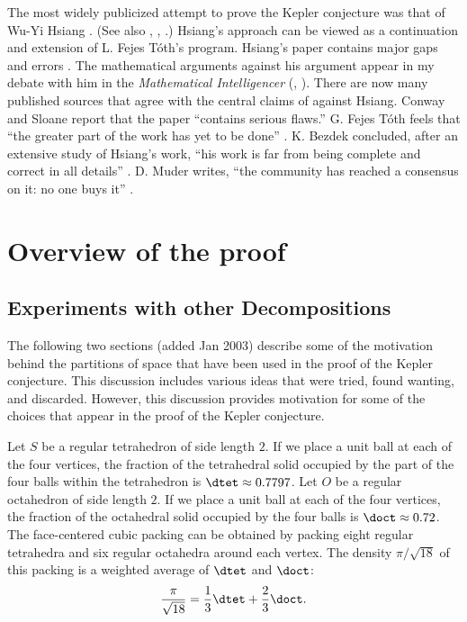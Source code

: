 \smallskip
The most widely publicized attempt to prove the Kepler conjecture
was that of Wu-Yi Hsiang \cite{Hsi93}.  (See also \cite{Hsi93a},
\cite{Hsi93b}, \cite{Hsi02}.)  Hsiang's approach can be viewed as
a continuation and extension of L. Fejes T\'oth's program.
Hsiang's paper contains major gaps and errors \cite{CoHMS94}.
  The mathematical arguments against his argument appear
in my
debate with him in the {\it Mathematical Intelligencer}
(\cite{Hal94}, \cite{Hsi95}).
There are now many published sources that agree with the central
claims of \cite{Hal94} against Hsiang.
Conway and Sloane report that the paper ``contains serious flaws.''
G. Fejes T\'oth feels that ``the greater part of the work has yet
to be done'' \cite{Fej95}.   K. Bezdek concluded,
after an extensive study of Hsiang's work, ``his work is far from being
complete and correct in all details'' \cite{Bez97}.
 D. Muder writes, ``the
community has reached a consensus on it: no one buys it'' \cite{Mud97}.


\chapter{Overview of the proof}

\section{Experiments with other Decompositions}
\label{sec:experiment}

The following two sections (added Jan 2003)  describe some of the
motivation behind the partitions of space that have been used in the
proof of the Kepler conjecture.  This discussion includes various
ideas that were tried, found wanting, and discarded. However, this
discussion provides motivation for some of the choices that appear
in the proof of the Kepler conjecture.

Let $S$ be a regular tetrahedron of side length $2$.  If we place a
unit ball at each of the four vertices, the fraction of the
tetrahedral solid occupied by the part of the four balls within the
tetrahedron is $\dtet\approx 0.7797$. Let $O$ be a regular
octahedron of side length $2$.  If we place a unit ball at each of
the four vertices, the fraction of the octahedral solid occupied by
the four balls is $\doct\approx 0.72$. The face-centered cubic
packing can be obtained by packing eight regular tetrahedra and six
regular octahedra around each vertex. The density $\pi/\sqrt{18}$ of
this packing is a weighted average of $\dtet$ and $\doct$:
    $$\frac\pi{\sqrt{18}} = \frac13\dtet + \frac23\doct.$$

